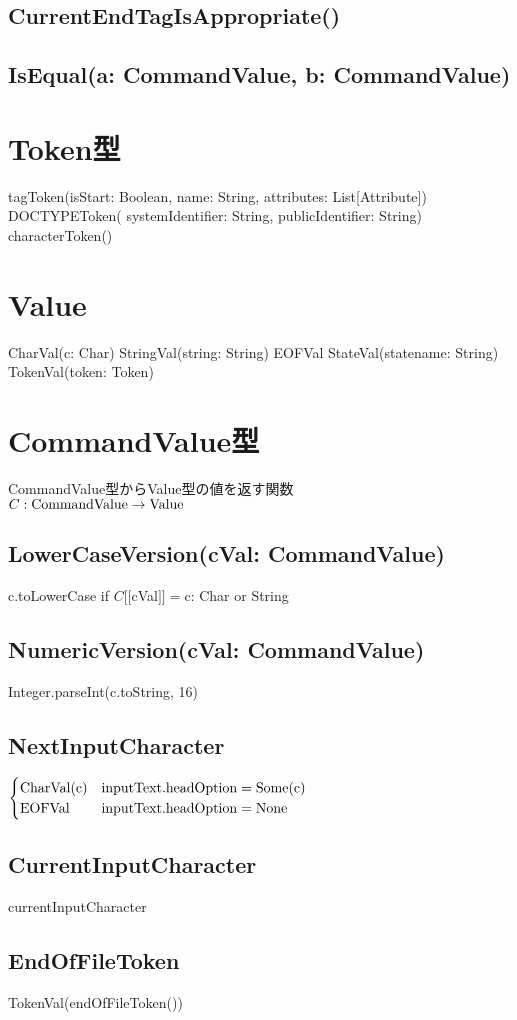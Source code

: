 \documentclass[uplatex,a4j]{jsreport}
\begin{document}
\subsection*{CurrentEndTagIsAppropriate()}
\subsection*{IsEqual(a: CommandValue, b: CommandValue)}

\section{Token型}
tagToken(isStart: Boolean, name: String, attributes: List[Attribute])
DOCTYPEToken( systemIdentifier: String, publicIdentifier: String)
characterToken()
\section{Value}
CharVal(c: Char)
StringVal(string: String)
EOFVal
StateVal(statename: String)
TokenVal(token: Token)

\section{CommandValue型}
CommandValue型からValue型の値を返す関数\\
$C : {\rm CommandValue} \rightarrow {\rm Value} $\\
\subsection*{LowerCaseVersion(cVal: CommandValue)}
c.toLowerCase if $C[\![$cVal$]\!] = $c: Char or String
\subsection*{NumericVersion(cVal: CommandValue)}
Integer.parseInt(c.toString, 16)
\subsection*{NextInputCharacter}
$
\begin{cases}
    {\rm CharVal(c)} & {\rm inputText.headOption} = {\rm Some(c)} \\
    {\rm EOFVal} & {\rm inputText.headOption} = {\rm None}
\end{cases}
$
\subsection*{CurrentInputCharacter}
currentInputCharacter
\subsection*{EndOfFileToken}
TokenVal(endOfFileToken())
\end{document}
